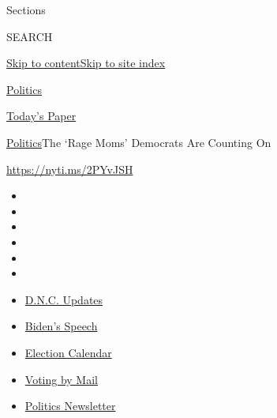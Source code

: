 Sections

SEARCH

\protect\hyperlink{site-content}{Skip to
content}\protect\hyperlink{site-index}{Skip to site index}

\href{https://www.nytimes3xbfgragh.onion/section/politics}{Politics}

\href{https://myaccount.nytimes3xbfgragh.onion/auth/login?response_type=cookie\&client_id=vi}{}

\href{https://www.nytimes3xbfgragh.onion/section/todayspaper}{Today's
Paper}

\href{/section/politics}{Politics}\textbar{}The `Rage Moms' Democrats
Are Counting On

\url{https://nyti.ms/2PYvJSH}

\begin{itemize}
\item
\item
\item
\item
\item
\item
\end{itemize}

\begin{itemize}
\item
  \href{https://www.nytimes3xbfgragh.onion/live/2020/08/20/us/dnc-convention-election?action=click\&pgtype=Article\&state=default\&region=TOP_BANNER\&context=storylines_menu}{D.N.C.
  Updates}
\item
  \href{https://www.nytimes3xbfgragh.onion/2020/08/20/us/politics/biden-presidential-nomination-dnc.html?action=click\&pgtype=Article\&state=default\&region=TOP_BANNER\&context=storylines_menu}{Biden's
  Speech}
\item
  \href{https://www.nytimes3xbfgragh.onion/interactive/2019/us/elections/2020-presidential-election-calendar.html?action=click\&pgtype=Article\&state=default\&region=TOP_BANNER\&context=storylines_menu}{Election
  Calendar}
\item
  \href{https://www.nytimes3xbfgragh.onion/interactive/2020/08/11/us/politics/vote-by-mail-us-states.html?action=click\&pgtype=Article\&state=default\&region=TOP_BANNER\&context=storylines_menu}{Voting
  by Mail}
\item
  \href{https://www.nytimes3xbfgragh.onion/newsletters/politics?action=click\&pgtype=Article\&state=default\&region=TOP_BANNER\&context=storylines_menu}{Politics
  Newsletter}
\end{itemize}

